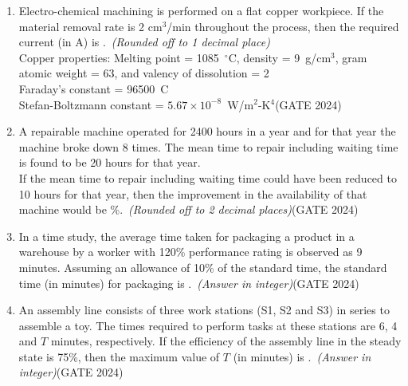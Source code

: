 \documentclass[journal,12pt,onecolumn]{IEEEtran}
\theoremstyle{remark}
\begin{document}
\begin{enumerate}
\item Electro-chemical machining is performed on a flat copper workpiece. If the material removal rate is 2 cm$^3$/min throughout the process, then the required current (in A) is \underline{\hspace{2cm}}.\ \textit{(Rounded off to 1 decimal place)}
\\ Copper properties: Melting point = 1085~$^\circ$C, density = 9~g/cm$^3$, gram atomic weight = 63, and valency of dissolution = 2\\
Faraday's constant = 96500~C\\
Stefan-Boltzmann constant = $5.67\times10^{-8}$~W/m$^2$-K$^4$\hfill{(GATE 2024)}
\vspace{1cm}

\item A repairable machine operated for 2400 hours in a year and for that year the machine broke down 8 times. The mean time to repair including waiting time is found to be 20 hours for that year.\\
If the mean time to repair including waiting time could have been reduced to 10 hours for that year, then the improvement in the availability of that machine would be \underline{\hspace{2cm}} \%.\ \textit{(Rounded off to 2 decimal places)}\hfill{(GATE 2024)}
\vspace{1cm}

\item In a time study, the average time taken for packaging a product in a warehouse by a worker with 120\% performance rating is observed as 9 minutes. Assuming an allowance of 10\% of the standard time, the standard time (in minutes) for packaging is \underline{\hspace{2cm}}.\ \textit{(Answer in integer)}\hfill{(GATE 2024)}
\vspace{1cm}

\item An assembly line consists of three work stations (S1, S2 and S3) in series to assemble a toy. The times required to perform tasks at these stations are 6, 4 and $T$ minutes, respectively. If the efficiency of the assembly line in the steady state is 75\%, then the maximum value of $T$ (in minutes) is \underline{\hspace{2cm}}.\ \textit{(Answer in integer)}\hfill{(GATE 2024)}
\vspace{1cm}


\end{enumerate}
\end{document}
